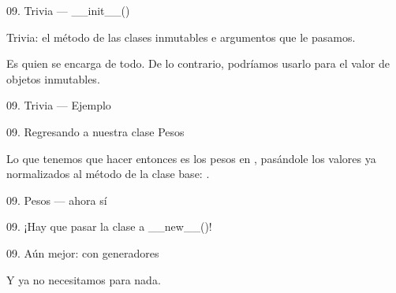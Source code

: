 \begin{frame}{09. Trivia — \_\_init\_\_()}
  \begin{alertblock}{}
    \centering
    Trivia: el método  de las clases inmutables
     e  argumentos que
    le pasamos.
  \end{alertblock}

  \begin{center}
    \small
    Es  quien se encarga de todo. De lo
    contrario, podríamos usarlo para  el valor de
    objetos inmutables.
  \end{center}
\end{frame}

\begin{frame}{09. Trivia — Ejemplo}
\end{frame}

\begin{frame}{09. Regresando a nuestra clase Pesos}
  \begin{block}{}
    \centering
    Lo que tenemos que hacer entonces es  los
    pesos en , pasándole los valores ya
    normalizados al método  de la clase base:
    .
  \end{block}
\end{frame}

\begin{frame}{09. Pesos — ahora sí}
  \footnotesize
\end{frame}


\begin{frame}{09. ¡Hay que pasar la clase a \_\_new\_\_()!}
  \scriptsize
\end{frame}

\begin{frame}{09. Aún mejor: con generadores}
  \scriptsize

  \begin{center}
    \small
    Y ya no necesitamos  para nada.
  \end{center}
\end{frame}


